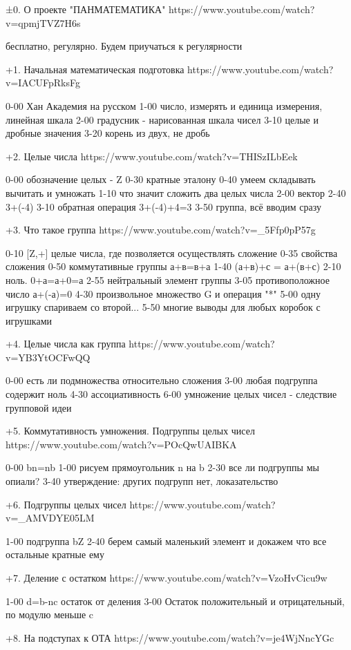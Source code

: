 ±0. О проекте "ПАНМАТЕМАТИКА"
https://www.youtube.com/watch?v=qpmjTVZ7H6s

бесплатно, регулярно. Будем приучаться к регулярности


+1. Начальная математическая подготовка
https://www.youtube.com/watch?v=IACUFpRksFg

0-00 Хан Академия на русском
1-00 число, измерять и единица измерения, линейная шкала
2-00 градусник - нарисованная шкала чисел
3-10 целые и дробные значения
3-20 корень из двух, не дробь


+2. Целые числа
https://www.youtube.com/watch?v=THISzILbEek

0-00 обозначение целых - Z
0-30 кратные эталону
0-40 умеем складывать вычитать и умножать
1-10 что значит сложить два целых числа
2-00 вектор
2-40 3+(-4)
3-10 обратная операция 3+(-4)+4=3
3-50 группа, всё вводим сразу

+3. Что такое группа
https://www.youtube.com/watch?v=_5Ffp0pP57g

0-10 [Z,+] целые числа, где позволяется осуществлять сложение
0-35 свойства сложения
0-50 коммутативные группы а+в=в+а
1-40 (а+в)+с = а+(в+с)
2-10 ноль. 0+а=а+0=а
2-55 нейтральный элемент группы
3-05 противоположное число а+(-а)=0
4-30 произвольное множество G и операция "*"
5-00 одну игрушку спариваем со второй...
5-50 многие выводы для любых коробок с игрушками

+4. Целые числа как группа
https://www.youtube.com/watch?v=YB3YtOCFwQQ

0-00 есть ли подмножества относительно сложения
3-00 любая подгруппа содержит ноль
4-30 ассоциативность
6-00 умножение целых чисел - следствие групповой идеи

+5. Коммутативность умножения. Подгруппы целых чисел
https://www.youtube.com/watch?v=POcQwUAIBKA

0-00 bn=nb
1-00 рисуем прямоугольник n на b
2-30 все ли подгруппы мы опиали?
3-40 утверждение: других подгрупп нет, локазательство

+6. Подгруппы целых чисел
https://www.youtube.com/watch?v=_AMVDYE05LM

1-00 подгруппа bZ
2-40 берем самый маленький элемент и докажем что все остальные кратные ему

+7. Деление с остатком
https://www.youtube.com/watch?v=VzoHvCicu9w

1-00 d=b-nc остаток от деления
3-00 Остаток положительный и отрицательный, по модулю меньше c

+8. На подступах к ОТА
https://www.youtube.com/watch?v=je4WjNncYGc


